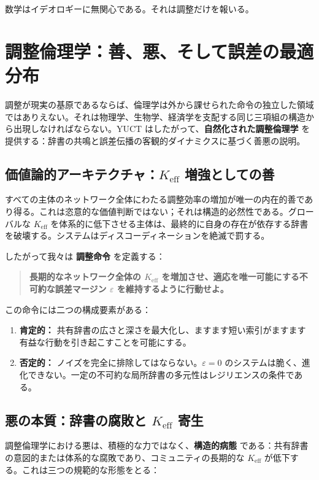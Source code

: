 \documentclass[12pt,a4paper]{article}
\begin{document}
	数学はイデオロギーに無関心である。それは調整だけを報いる。
	
	\section{調整倫理学：善、悪、そして誤差の最適分布}
	\label{sec:coordination-ethics}
	
	調整が現実の基原であるならば、倫理学は外から課せられた命令の独立した領域ではありえない。それは物理学、生物学、経済学を支配する同じ三項組の構造から出現しなければならない。YUCT はしたがって、\textbf{自然化された調整倫理学} を提供する：辞書の共鳴と誤差伝播の客観的ダイナミクスに基づく善悪の説明。
	
	\subsection{価値論的アーキテクチャ：\(K_{\mathrm{eff}}\) 増強としての善}
	
	すべての主体のネットワーク全体にわたる調整効率の増加が唯一の内在的善であり得る。これは恣意的な価値判断ではない；それは構造的必然性である。グローバルな \(K_{\mathrm{eff}}\) を体系的に低下させる主体は、最終的に自身の存在が依存する辞書を破壊する。システムはディスコーディネーションを絶滅で罰する。
	
	したがって我々は \textbf{調整命令} を定義する：
	
	\begin{quote}
		\textbf{長期的なネットワーク全体の $K_{\mathrm{eff}}$ を増加させ、適応を唯一可能にする不可約な誤差マージン $\varepsilon$ を維持するように行動せよ。}
	\end{quote}
	
	この命令には二つの構成要素がある：
	\begin{enumerate}[leftmargin=*]
		\item \textbf{肯定的：} 共有辞書の広さと深さを最大化し、ますます短い索引がますます有益な行動を引き起こすことを可能にする。
		\item \textbf{否定的：} ノイズを完全に排除してはならない。\(\varepsilon = 0\) のシステムは脆く、進化できない。一定の不可約な局所辞書の多元性はレジリエンスの条件である。
	\end{enumerate}
	
	\subsection{悪の本質：辞書の腐敗と \(K_{\mathrm{eff}}\) 寄生}
	
	調整倫理学における悪は、積極的な力ではなく、\textbf{構造的病態} である：共有辞書の意図的または体系的な腐敗であり、コミュニティの長期的な \(K_{\mathrm{eff}}\) が低下する。これは三つの規範的な形態をとる：
	
\end{document}
